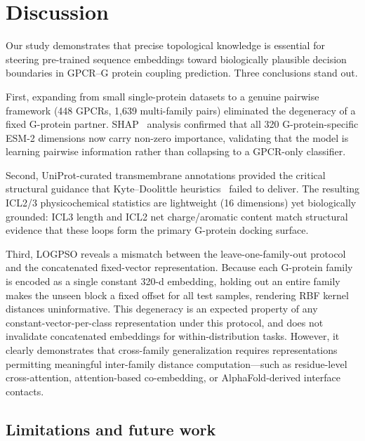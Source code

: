 \documentclass[11pt,a4paper]{article}
\begin{document}
\section{Discussion}

Our study demonstrates that precise topological knowledge is essential for steering pre-trained sequence embeddings toward biologically plausible decision boundaries in GPCR--G protein coupling prediction. Three conclusions stand out.

First, expanding from small single-protein datasets to a genuine pairwise framework (448 GPCRs, 1,639 multi-family pairs) eliminated the degeneracy of a fixed G-protein partner. SHAP~\cite{lundberg2017unified} analysis confirmed that all 320 G-protein-specific ESM-2 dimensions now carry non-zero importance, validating that the model is learning pairwise information rather than collapsing to a GPCR-only classifier.

Second, UniProt-curated transmembrane annotations provided the critical structural guidance that Kyte--Doolittle heuristics~\cite{kyte1982simple} failed to deliver. The resulting ICL2/3 physicochemical statistics are lightweight (16 dimensions) yet biologically grounded: ICL3 length and ICL2 net charge/aromatic content match structural evidence that these loops form the primary G-protein docking surface.

Third, LOGPSO reveals a mismatch between the leave-one-family-out protocol and the concatenated fixed-vector representation. Because each G-protein family is encoded as a single constant 320-d embedding, holding out an entire family makes the unseen block a fixed offset for all test samples, rendering RBF kernel distances uninformative. This degeneracy is an expected property of any constant-vector-per-class representation under this protocol, and does not invalidate concatenated embeddings for within-distribution tasks. However, it clearly demonstrates that cross-family generalization requires representations permitting meaningful inter-family distance computation---such as residue-level cross-attention, attention-based co-embedding, or AlphaFold-derived interface contacts.

\subsection{Limitations and future work}
\end{document}
